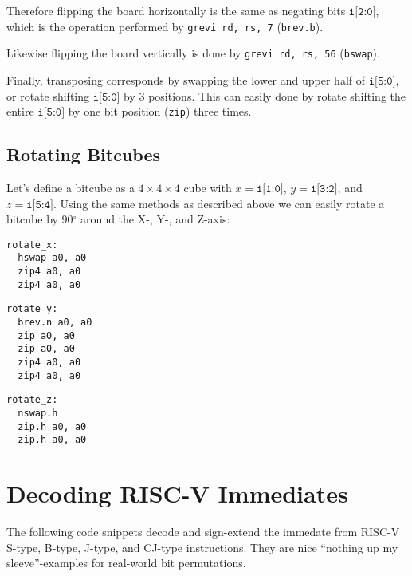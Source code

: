 Therefore flipping the board horizontally is the same as negating bits $\texttt{i[2:0]}$,
which is the operation performed by {\tt grevi rd, rs, 7} ({\tt brev.b}).

Likewise flipping the board vertically is done by {\tt grevi rd, rs, 56} ({\tt bswap}).

Finally, transposing corresponds by swapping the lower and upper half of $\texttt{i[5:0]}$,
or rotate shifting $\texttt{i[5:0]}$ by 3 positions. This can easily done by rotate shifting the entire
$\texttt{i[5:0]}$ by one bit position ({\tt zip}) three times.

\subsection{Rotating Bitcubes}

Let's define a bitcube as a $4 \times 4 \times 4$ cube with $x=\texttt{i[1:0]}$,
$y=\texttt{i[3:2]}$, and $z=\texttt{i[5:4]}$. Using the same methods as described
above we can easily rotate a bitcube by 90$^\circ$ around the X-, Y-, and Z-axis:

\begin{multicols}{3}
\begin{minipage}{\linewidth}
\begin{verbatim}
rotate_x:
  hswap a0, a0
  zip4 a0, a0
  zip4 a0, a0
\end{verbatim}
\end{minipage}

\begin{minipage}{\linewidth}
\begin{verbatim}
rotate_y:
  brev.n a0, a0
  zip a0, a0
  zip a0, a0
  zip4 a0, a0
  zip4 a0, a0
\end{verbatim}
\end{minipage}

\begin{minipage}{\linewidth}
\begin{verbatim}
rotate_z:
  nswap.h
  zip.h a0, a0
  zip.h a0, a0
\end{verbatim}
\end{minipage}
\end{multicols}

\section{Decoding RISC-V Immediates}

The following code snippets decode and sign-extend the immedate from RISC-V
S-type, B-type, J-type, and CJ-type instructions. They are nice ``nothing up my
sleeve''-examples for real-world bit permutations.

